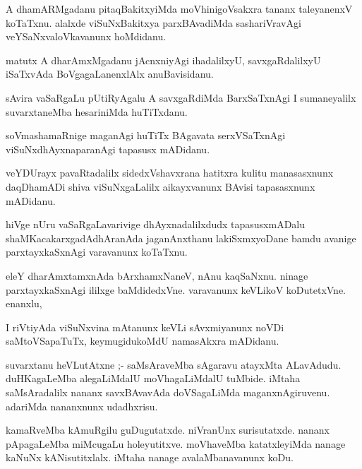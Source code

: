 \documentclass{article}
\begin{document}
\begin{mn}
A dhamARMgadanu  pitaqBakitxyiMda moVhinigoVsakxra  tananx taleyanenxV koTaTxnu.  
alalxde viSuNxBakitxya parxBAvadiMda  sashariVravAgi veYSaNxvaloVkavanunx hoMdidanu.
\end{mn}

\begin{mn}
matutx A dharAmxMgadanu  jAcnxniyAgi ihadalilxyU, savxgaRdalilxyU  iSaTxvAda 
BoVgagaLanenxlAlx  anuBavisidanu.
\end{mn}

\begin{mn}
sAvira vaSaRgaLu pUtiRyAgalu A savxgaRdiMda BarxSaTxnAgi I sumaneyalilx  
suvarxtaneMba hesariniMda  huTiTxdanu.
\end{mn}

\begin{mn}
soVmashamaRnige maganAgi huTiTx BAgavata serxVSaTxnAgi  viSuNxdhAyxnaparanAgi  tapasusx mADidanu.
\end{mn}

\begin{mn}
veYDUrayx pavaRtadalilx  sidedxVshavxrana hatitxra kulitu manasasxnunx 
daqDhamADi shiva viSuNxgaLalilx aikayxvanunx BAvisi tapasasxnunx mADidanu.
\end{mn}

\begin{mn}
hiVge nUru vaSaRgaLavarivige dhAyxnadalilxdudx  tapasusxmADalu  shaMKacakarxgadAdhAranAda 
jaganAnxthanu lakiSxmxyoDane bamdu avanige parxtayxkaSxnAgi varavanunx koTaTxnu.
\end{mn}

\begin{mn}
eleY dharAmxtamxnAda bArxhamxNaneV, nAnu kaqSaNxnu. ninage parxtayxkaSxnAgi 
ililxge baMdidedxVne.  varavanunx keVLikoV koDutetxVne. enanxlu, 
\end{mn}

\begin{mn}
I riVtiyAda viSuNxvina mAtanunx keVLi sAvxmiyanunx noVDi saMtoVSapaTuTx, 
keymugidukoMdU namasAkxra mADidanu.  
\end{mn}

\begin{mn}
suvarxtanu heVLutAtxne ;- saMsAraveMba sAgaravu atayxMta ALavAdudu.  
duHKagaLeMba  alegaLiMdalU  moVhagaLiMdalU  tuMbide. iMtaha saMsAradalilx 
nananx savxBAvavAda  doVSagaLiMda  maganxnAgiruvenu. adariMda nananxnunx udadhxrisu. 
\end{mn}

\begin{mn}
kamaRveMba  kAmuRgilu guDugutatxde.  niVranUnx surisutatxde.  nananx 
pApagaLeMba miMcugaLu holeyutitxve.  moVhaveMba katatxleyiMda  nanage 
kaNuNx kANisutitxlalx.  iMtaha nanage avalaMbanavanunx  koDu.
\end{mn}
\end{document}
